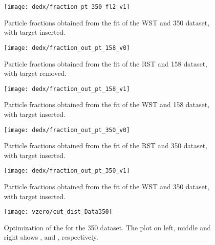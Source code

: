 \begin{figure}
  \centering
  \texttt{[image: dedx/fraction\_pt\_350\_fl2\_v1]}
  \caption{Particle fractions obtained from the \dedx fit of the WST and 350 \GeVc dataset, with target inserted.}
  \label{fig:hadron:dedx:fit:final350w}
\end{figure}

\begin{figure}
  \centering
  \texttt{[image: dedx/fraction\_out\_pt\_158\_v0]}
  \caption{Particle fractions obtained from the \dedx fit of the RST and 158 \GeVc dataset, with target removed.}
  \label{fig:hadron:dedx:fit:out158r}
\end{figure}

\begin{figure}
  \centering
  \texttt{[image: dedx/fraction\_out\_pt\_158\_v1]}
  \caption{Particle fractions obtained from the \dedx fit of the WST and 158 \GeVc dataset, with target inserted.}
  \label{fig:hadron:dedx:fit:out158w}
\end{figure}

\begin{figure}
  \centering
  \texttt{[image: dedx/fraction\_out\_pt\_350\_v0]}
  \caption{Particle fractions obtained from the \dedx fit of the RST and 350 \GeVc dataset, with target inserted.}
  \label{fig:hadron:dedx:fit:out350r}
\end{figure}

\begin{figure}
  \centering
  \texttt{[image: dedx/fraction\_out\_pt\_350\_v1]}
  \caption{Particle fractions obtained from the \dedx fit of the WST and 350 \GeVc dataset, with target inserted.}
  \label{fig:hadron:dedx:fit:out350w}
\end{figure}



\begin{figure}
  \centering
  \texttt{[image: vzero/cut\_dist\_Data350]}
  
  \caption{Optimization of the \decaydistmin for the 350 \GeVc dataset. The plot on left, middle and right shows \lamb, \antilamb and \kzeros, respectively.}
  \label{fig:hadron:vzero:cuts:decaydist:350}
\end{figure}

